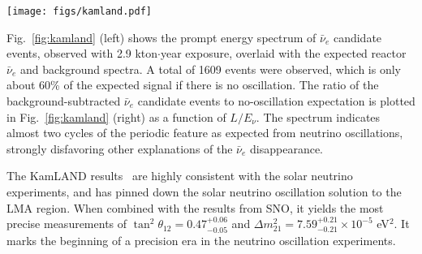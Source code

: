 \begin{figure*}[htb] \label{fig:kamland}
  \centering
  \texttt{[image: figs/kamland.pdf]}
  \caption{{\bf KamLAND results}~\cite{Kamland08}: (left) Prompt energy spectrum of $\bar\nu_e$ candidate
  events. All histograms corresponding to reactor spectra and expected
  backgrounds incorporate the energy-dependent selection efficiency
  (top panel). The shaded background and geoneutrino histograms are
  cumulative. 
  (right) Ratio of the background-subtracted
  $\bar\nu_e$ spectrum to the expectation for no-oscillation as a
  function of $L_{0}/E_{\nu}$. $L_{0}$ is the effective baseline taken as a
  flux-weighted average ($L_{0}$\,=\,180\,km). The oscillation survival probability using the best estimates of $\theta_{12}$ and $|\Delta{m}^2_{21}|$ is given by the blue curve.}
\end{figure*}

Fig.~\ref{fig:kamland} (left) shows the prompt energy spectrum of $\bar\nu_e$ candidate
events, observed with 2.9 kton$\cdot$year exposure, overlaid with the expected reactor $\bar\nu_{e}$ and background spectra. A total of 1609 events were observed, which is only about 60\% of the expected signal if there is no oscillation. The ratio of the background-subtracted $\bar\nu_e$ candidate events to no-oscillation expectation is plotted in Fig.~\ref{fig:kamland} (right) as a function of $L/E_{\nu}$. The spectrum indicates almost two cycles of the periodic feature as expected from neutrino oscillations, strongly disfavoring other explanations of the $\bar\nu_e$ disappearance.

The KamLAND results~\cite{Kamland03,Kamland05,Kamland08} are highly consistent with the solar neutrino experiments, and has pinned down the solar neutrino oscillation solution to the LMA region. When combined with the results from SNO, it yields the most precise measurements of $\tan^2\theta_{12} = 0.47^{+0.06}_{-0.05}$ and $\Delta m^2_{21} = 7.59^{+0.21}_{-0.21} \times 10^{-5}$ eV$^2$. It marks the beginning of a precision era in the neutrino oscillation experiments.

